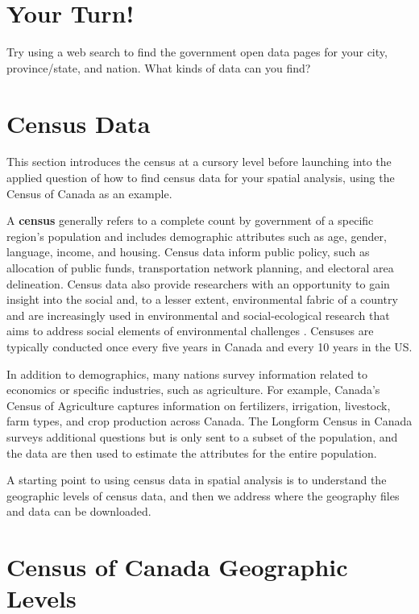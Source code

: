 \documentclass[
]{book}
\begin{document}
\section*{Your Turn!}\label{your-turn-1}

Try using a web search to find the government open data pages for your city, province/state, and nation. What kinds of data can you find?

\section{Census Data}\label{census-data}

This section introduces the census at a cursory level before launching into the applied question of how to find census data for your spatial analysis, using the Census of Canada as an example.

A \textbf{census} generally refers to a complete count by government of a specific region's population and includes demographic attributes such as age, gender, language, income, and housing. Census data inform public policy, such as allocation of public funds, transportation network planning, and electoral area delineation. Census data also provide researchers with an opportunity to gain insight into the social and, to a lesser extent, environmental fabric of a country and are increasingly used in environmental and social-ecological research that aims to address social elements of environmental challenges \citep{tomscha_guide_2016} \citep{biggs_routledge_2021}. Censuses are typically conducted once every five years in Canada and every 10 years in the US.

In addition to demographics, many nations survey information related to economics or specific industries, such as agriculture. For example, Canada's Census of Agriculture captures information on fertilizers, irrigation, livestock, farm types, and crop production across Canada. The Longform Census in Canada surveys additional questions but is only sent to a subset of the population, and the data are then used to estimate the attributes for the entire population.

A starting point to using census data in spatial analysis is to understand the geographic levels of census data, and then we address where the geography files and data can be downloaded.

\section{Census of Canada Geographic Levels}\label{census-of-canada-geographic-levels}
\end{document}
